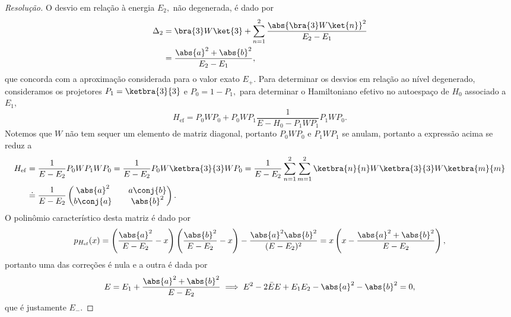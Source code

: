 \begin{proof}[Resolução]
    O desvio em relação à energia \(E_2,\) não degenerada, é dado por
    \begin{align*}
        \Delta_2 &= \bra{3} W \ket{3} +\sum_{n = 1}^{2} \frac{\abs{\bra{3}W\ket{n}}^2}{E_2 - E_1}\\
                 &= \frac{\abs{a}^2 + \abs{b}^2}{E_2 - E_1},
    \end{align*}
    que concorda com a aproximação considerada para o valor exato \(E_+.\) Para determinar os desvios em relação ao nível degenerado, consideramos os projetores \(P_1 = \ketbra{3}{3}\) e \(P_0 = 1 - P_1,\) para determinar o Hamiltoniano efetivo no autoespaço de \(H_0\) associado a \(E_1,\)
    \begin{equation*}
        H_\mathrm{ef} = P_0 W P_0 + P_0 W P_1 \frac{1}{E - H_0 - P_1 W P_1} P_1 W P_0.
    \end{equation*}
    Notemos que \(W\) não tem sequer um elemento de matriz diagonal, portanto \(P_0 W P_0\) e \(P_1 W P_1\) se anulam, portanto a expressão acima se reduz a 
    \begin{align*}
        H_\mathrm{ef} &= \frac{1}{E - E_2} P_0 W P_1 W P_0 = \frac{1}{E - E_2} P_0 W \ketbra{3}{3} W P_0 = \frac{1}{E - E_2} \sum_{n = 1}^2 \sum_{m = 1}^2 \ketbra{n}{n} W \ketbra{3}{3} W \ketbra{m}{m}\\
                      &\doteq \frac{1}{E - E_2}\begin{pmatrix}
                          \abs{a}^2 && a \conj{b}\\
                          b\conj{a} && \abs{b}^2
                      \end{pmatrix}.
    \end{align*}
    O polinômio característico desta matriz é dado por
    \begin{equation*}
        p_{H_\mathrm{ef}}(x) = \left(\frac{\abs{a}^2}{E - E_2} - x\right)\left(\frac{\abs{b}^2}{E - E_2} - x\right) - \frac{\abs{a}^2 \abs{b}^2}{(E - E_2)^2} = x \left(x - \frac{\abs{a}^2 + \abs{b}^2}{E - E_2}\right),
    \end{equation*}
    portanto uma das correções é nula e a outra é dada por
    \begin{equation*}
        E = E_1 + \frac{\abs{a}^2 + \abs{b}^2}{E - E_2} \implies E^2 - 2 \bar{E} E + E_1 E_2 - \abs{a}^2 - \abs{b}^2 = 0,
    \end{equation*}
    que é justamente \(E_-.\)
\end{proof}
